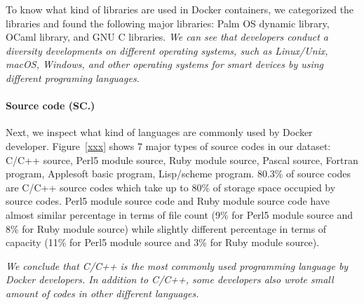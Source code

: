  
 
To know what kind of libraries are used in Docker containers, we categorized the libraries and found the following major libraries: Palm OS dynamic library, OCaml library, and GNU C libraries. 
\textit{We can see that developers conduct a diversity developments on different operating systems, such as Linux/Unix, macOS, Windows, and other operating systems for smart devices by using different programing languages.} 
\paragraph{Source code (SC.)}
Next, we inspect what kind of languages are commonly used by Docker developer. 
Figure~\ref{xxx} shows 7 major types of source codes in our dataset: C/C++ source, Perl5 module source, Ruby module source, Pascal source, Fortran program, Applesoft basic program, Lisp/scheme program.
80.3\% of source codes are C/C++ source codes which take up to 80\% of storage space occupied by source codes. Perl5 module source code and Ruby module source code have almost similar percentage in terms of file count (9\% for Perl5 module source and 8\% for Ruby module source) while slightly different percentage in terms of capacity (11\% for Perl5 module source and 3\% for Ruby module source).

\textit{We conclude that C/C++ is the most commonly used programming language by Docker developers. In addition to C/C++, some developers also wrote small amount of codes in other different languages.}


